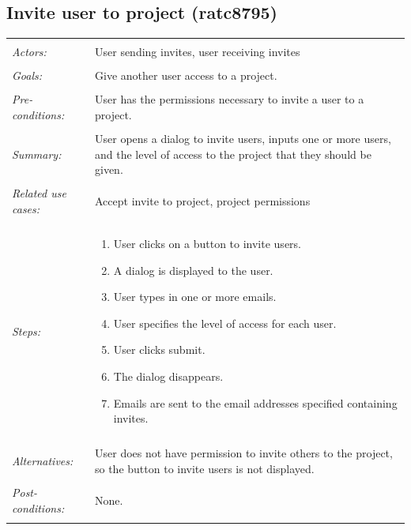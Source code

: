 \documentclass[11pt]{report}
\begin{document}
\begin{IDE-like Features}
\begin{}
\begin{Collaborative features that would be "nice":}
\subsection{Invite user to project (ratc8795)}
\begin{tabular}{ p{2cm} p{12cm} }
 \hline
 \\
 \textit{Actors:} & User sending invites, user receiving invites \\ 
 \\
 \textit{Goals:} & Give another user access to a project. \\
 \\
 \textit{Pre-conditions:} & User has the permissions necessary to invite a user to a project. \\
 \\
 \textit{Summary:} & User opens a dialog to invite users, inputs one or more users, and the level of access to the project that they should be given. \\ 
 \\
 \textit{Related use cases:} & Accept invite to project,  project permissions \\ 
 \\
 \textit{Steps:} & \begin{enumerate}
  \item User clicks on a button to invite users.
  \item A dialog is displayed to the user.
  \item User types in one or more emails.
  \item User specifies the level of access for each user.
  \item User clicks submit.
  \item The dialog disappears.
  \item Emails are sent to the email addresses specified containing invites.
 \end{enumerate} \\
 \\
 \textit{Alternatives:} & User does not have permission to invite others to the project, so the button to invite users is not displayed. \\
 \\
 \textit{Post-conditions:} & None. \\
 \\
\hline
\end{tabular}


\end{Collaborative features that would be "nice":}
\end{}
\end{IDE-like Features}
\end{document}
